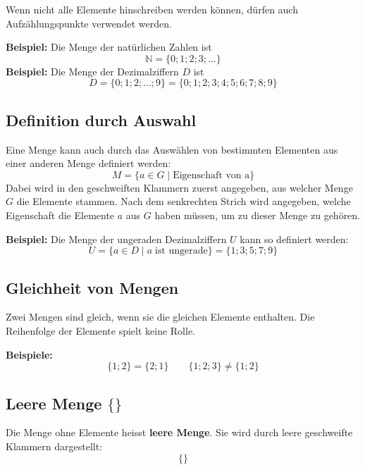 Wenn nicht alle Elemente hinschreiben werden können, dürfen auch Aufzählungspunkte verwendet werden.

\begin{example}
  \textbf{Beispiel:}  Die Menge der natürlichen Zahlen ist
  \[
    \mathbb{N} = \{0; 1; 2; 3;\ldots \}
  \]
  \textbf{Beispiel:} Die Menge der Dezimalziffern $D$ ist
  \[
    D = \{ 0; 1; 2; \ldots ; 9 \} = \{ 0;1;2;3;4;5;6;7;8;9 \}
  \]
\end{example}

\subsection{Definition durch Auswahl}

Eine Menge kann auch durch das Auswählen von bestimmten Elementen aus einer anderen Menge definiert werden:
\[
  M = \{ a \in G\mid \text{Eigenschaft von a} \}
\]
Dabei wird in den geschweiften Klammern zuerst angegeben, aus welcher Menge $G$ die Elemente stammen. Nach dem senkrechten Strich wird angegeben, welche Eigenschaft die Elemente $a$ aus $G$ haben müssen, um zu dieser Menge zu gehören.

\begin{example}
  \textbf{Beispiel:} Die Menge der ungeraden Dezimalziffern $U$ kann so definiert werden:
  \[
    U = \{ a \in D \mid a \;\text{ist ungerade} \} = \{ 1; 3; 5; 7; 9 \}
  \]
\end{example}

\subsection{Gleichheit von Mengen}
Zwei Mengen sind gleich, wenn sie die gleichen Elemente enthalten. Die Reihenfolge der Elemente spielt keine Rolle.
\begin{example}
  \textbf{Beispiele:}
  \[
    \{1;2\} = \{2;1\} \qquad \{1;2;3\} \neq \{1;2\}
  \]
\end{example}

\subsection{Leere Menge $\{\}$}
Die Menge ohne Elemente heisst \textbf{leere Menge}. Sie wird durch leere geschweifte Klammern dargestellt:
\[
  \{ \}
\]

